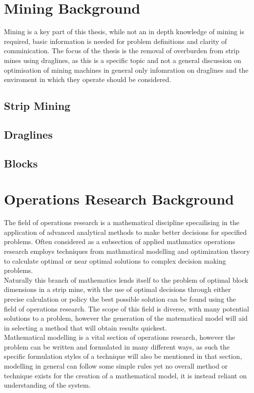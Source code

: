 \section{Mining Background}
Mining is a key part of this thesis, while not an in depth knowledge of mining is required, basic information is needed for problem definitions and clarity of comminication. The focus of the thesis is the removal of overburden from strip mines using draglines, as this is a specific topic and not a general discussion on optimisation of mining machines in general only infomration on draglines and the enviroment in which they operate should be considered. 
\subsection{Strip Mining}
\subsection{Draglines}
\subsection{Blocks}

\section{Operations Research Background}
The field of operations research is a mathematical discipline specailising in the application of advanced analytical methods to make better decisions for specified problems. Often considered as a subsection of applied mathmatics operations research employs techniques from mathmatical modelling and optimization theory to calculate optimal or near optimal solutions to complex decision making problems. \\ Naturally this branch of mathematics lends itself to the problem of optimal block dimensions in a strip mine, with the use of optimal decisions through either precise calculation or policy the best possible solution can be found using the field of operations research. The scope of this field is diverse, with many potential solutions to a problem, however the generation of the matematical model will aid in selecting a method that will obtain results quickest. 
\\
Mathematical modelling is a vital section of operations research, however the problem can be written and formulated in many different ways, as such the specific formulation styles of a technique will also be mentioned in that section, modelling in general can follow some simple rules yet no overall method or technique exists for the creation of a mathematical model, it is instead reliant on understanding of the system. 

